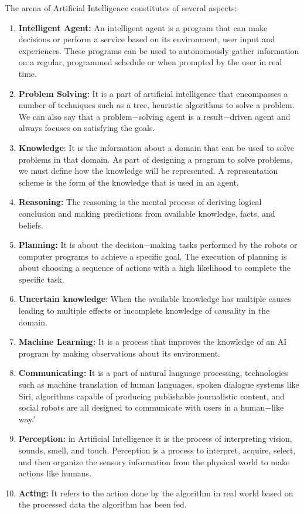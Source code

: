 \documentclass{article}
\begin{document}
The arena of Artificial Intelligence constitutes of several aspects:

\begin{enumerate}
	\item \textbf{Intelligent Agent: }An intelligent agent is a program that can make decisions or perform a service based on its environment, user input and experiences. These programs can be used to autonomously gather information on a regular, programmed schedule or when prompted by the user in real time.

	\item \textbf{Problem Solving: }It is a part of artificial intelligence that encompasses a number of techniques such as a tree, heuristic algorithms to solve a problem. We can also say that a problem$-$solving agent is a result$-$driven agent and always focuses on satisfying the goals.

	\item \textbf{Knowledge}: It is the information about a domain that can be used to solve problems in that domain. As part of designing a program to solve problems, we must define how the knowledge will be represented. A representation scheme is the form of the knowledge that is used in an agent.

	\item \textbf{Reasoning: }The reasoning is the mental process of deriving logical conclusion and making predictions from available knowledge, facts, and beliefs.

	\item \textbf{Planning:} It is about the decision$-$making tasks performed by the robots or computer programs to achieve a specific goal. The execution of planning is about choosing a sequence of actions with a high likelihood to complete the specific task.

	\item \textbf{Uncertain knowledge}: When the available knowledge has multiple causes leading to multiple effects or incomplete knowledge of causality in the domain.

	\item \textbf{Machine Learning: }It is a process that improves the knowledge of an AI program by making observations about its environment.

	\item \textbf{Communicating:} It is a part of natural language processing, technologies such as machine translation of human languages, spoken dialogue systems like Siri, algorithms capable of producing publishable journalistic content, and social robots are all designed to communicate with users in a human$-$like way.’

	\item \textbf{Perception:} in Artificial Intelligence it is the process of interpreting vision, sounds, smell, and touch. Perception is a process to interpret, acquire, select, and then organize the sensory information from the physical world to make actions like humans.

	\item \textbf{Acting:} It refers to the action done by the algorithm in real world based on the processed data the algorithm has been fed.\end{enumerate}
\end{document}
